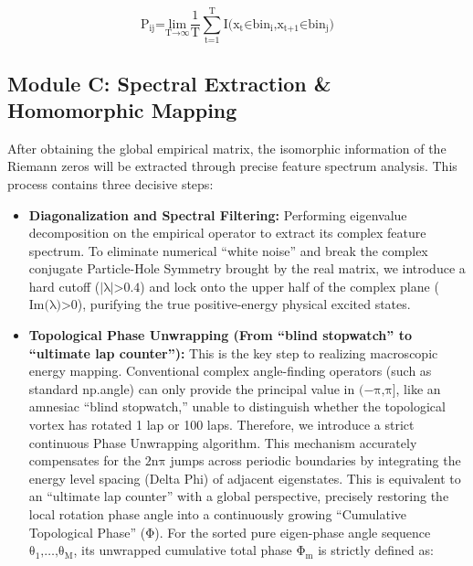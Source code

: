 \[\text{P}_{\text{ij}}\text{=}\underset{\text{T}\text{→∞}}{\text{lim}}\frac{\text{1}}{\text{T}}\sum_{\text{t}\text{=1}}^{\text{T}}\text{I}\text{(}\text{x}_{\text{t}}\text{∈}\text{bin}_{\text{i}}\text{,}\text{x}_{\text{t}\text{+1}}\text{∈}\text{bin}_{\text{j}}\text{)}\]

\subsection*{Module C: Spectral Extraction \& Homomorphic Mapping}

After obtaining the global empirical matrix, the isomorphic information
of the Riemann zeros will be extracted through precise feature spectrum
analysis. This process contains three decisive steps:

\begin{itemize}
\item
  \textbf{Diagonalization and Spectral Filtering:} Performing eigenvalue
  decomposition on the empirical operator to extract its complex feature
  spectrum. To eliminate numerical ``white noise'' and break the complex
  conjugate Particle-Hole Symmetry brought by the real matrix, we
  introduce a hard cutoff (\(\text{|}\text{λ}\text{|>0.4}\)) and lock
  onto the upper half of the complex plane
  (\(\text{Im(}\text{λ}\text{)>0}\)), purifying the true positive-energy
  physical excited states.
\item
  \textbf{Topological Phase Unwrapping (From ``blind stopwatch'' to
  ``ultimate lap counter''):} This is the key step to realizing
  macroscopic energy mapping. Conventional complex angle-finding
  operators (such as standard np.angle) can only provide the principal
  value in \(\text{(−}\text{π}\text{,}\text{π}\text{]}\), like an
  amnesiac ``blind stopwatch,'' unable to distinguish whether the
  topological vortex has rotated 1 lap or 100 laps. Therefore, we
  introduce a strict continuous Phase Unwrapping algorithm. This
  mechanism accurately compensates for the \(\text{2}\text{nπ}\) jumps
  across periodic boundaries by integrating the energy level spacing
  (Delta Phi) of adjacent eigenstates. This is equivalent to an
  ``ultimate lap counter'' with a global perspective, precisely
  restoring the local rotation phase angle into a continuously growing
  ``Cumulative Topological Phase'' (\(\text{Φ}\)). For the sorted pure
  eigen-phase angle sequence
  \(\text{θ}_{\text{1}}\text{,…,}\text{θ}_{\text{M}}\), its unwrapped
  cumulative total phase \(\text{Φ}_{\text{m}}\) is strictly defined as:
\end{itemize}


